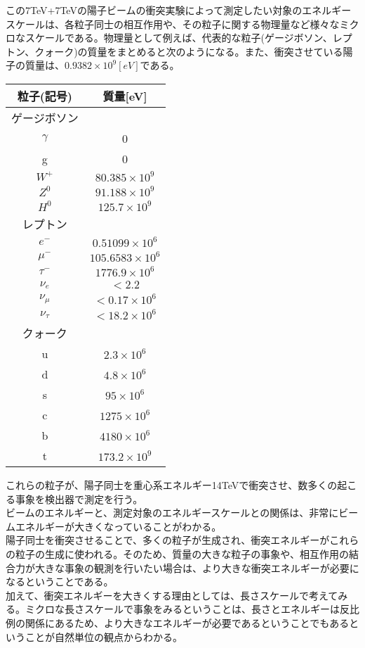 \documentclass[10pt]{jreport}
\begin{document}
この7TeV+7TeVの陽子ビームの衝突実験によって測定したい対象のエネルギースケールは、各粒子同士の相互作用や、その粒子に関する物理量など様々なミクロなスケールである。物理量として例えば、代表的な粒子(ゲージボソン、レプトン、クォーク)の質量をまとめると次のようになる。また、衝突させている陽子の質量は、$0.9382\times 10^9[eV]$である。
\begin{table}[h]
\centering
\begin{tabular}{|c|c|} \hline
	粒子(記号) & 質量[eV]　\\ \hline
	ゲージボソン & \\
	$\gamma$ &0 \\
	g & 0 \\
	$W^+$ & $80.385 \times 10^{9}$ \\
	$Z^0$ & $91.188 \times 10^{9}$ \\
	$H^0$ & $125.7 \times 10^{9}$ \\
	レプトン　& \\
	$e^- $ & $0.51099 \times 10^6$ \\
	$\mu^-$ & $105.6583 \times 10^6 $ \\
	$\tau ^-$ & $1776.9\times 10^6 $ \\
	$\nu_e$ & $<2.2$ \\
	$\nu_{\mu}$ & $<0.17\times 10^6$ \\
	$\nu_{\tau }$ & $<18.2\times 10^6$ \\
	クォーク　& \\
	u &$2.3\times 10^6 $ \\
	d & $4.8 \times 10^6$ \\
	s & $95\times 10^6$ \\
	c & $1275\times 10^6$ \\
	b & $4180\times 10^6$ \\
	t & $173.2\times 10^9$ \\ \hline
	
\end{tabular}
\end{table}

これらの粒子が、陽子同士を重心系エネルギー14TeVで衝突させ、数多くの起こる事象を検出器で測定を行う。\\
ビームのエネルギーと、測定対象のエネルギースケールとの関係は、非常にビームエネルギーが大きくなっていることがわかる。\\
陽子同士を衝突させることで、多くの粒子が生成され、衝突エネルギーがこれらの粒子の生成に使われる。そのため、質量の大きな粒子の事象や、相互作用の結合力が大きな事象の観測を行いたい場合は、より大きな衝突エネルギーが必要になるということである。\\
加えて、衝突エネルギーを大きくする理由としては、長さスケールで考えてみる。ミクロな長さスケールで事象をみるということは、長さとエネルギーは反比例の関係にあるため、より大きなエネルギーが必要であるということでもあるということが自然単位の観点からわかる。\\
\end{document}
